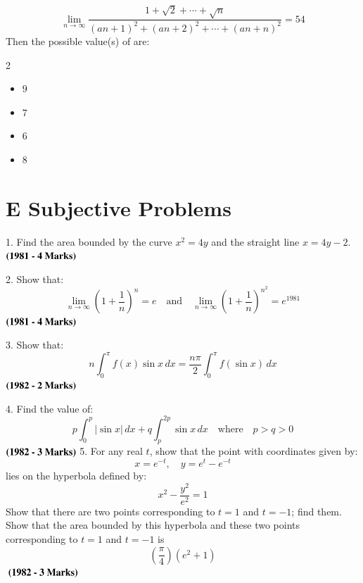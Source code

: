 \documentclass[journal,12pt,twocolumn]{IEEEtran}
\theoremstyle{remark}
\begin{document}
												     \[
												     \lim_{{n \to \infty}}
												         \frac{
													         1 + \sqrt{2} + \cdots + \sqrt{n}
														     }{
														             (an+1)^2 + (an+2)^2 + \cdots + (an+n)^2
															         } = 54
																 \]
																 Then the possible value(s) of  are:
																 \begin{multicols}{2}
																 \begin{itemize}
																     \item[(a)] $9$
																         \item[(b)] $7$
																	     \item[(c)] $6$
																	         \item[(d)] $8$
																		 \end{itemize}
																		 \end{multicols}
																		 \section*{E Subjective Problems}

																		 1. Find the area bounded by the curve \( x^2 = 4y \) and the straight line \( x = 4y - 2 \). $\hfill \textbf{(1981 - 4 Marks)}$

																		 2. Show that:
																		 \[
																		 \lim_{n \to \infty} \left(1 + \frac{1}{n}\right)^n = e \quad \text{and} \quad \lim_{n \to \infty} \left(1 + \frac{1}{n}\right)^{n^2} = e^{1981}
																		 \]
																		 $\hfill \textbf{(1981 - 4 Marks)}$

																		 3. Show that:
																		 \[
																		 n \int_0^\pi f(x) \sin x \, dx = \frac{n\pi}{2} \int_0^\pi f(\sin x) \, dx
																		 \]
																		 $\hfill \textbf{(1982 - 2 Marks)}$

																		 4. Find the value of:
																		 \[
																		 p \int_0^p |\sin x| \, dx + q \int_p^{2p} \sin x \, dx \quad \text{where} \quad p > q > 0
																		 \]
																		 $\hfill \textbf{(1982 - 3 Marks)}$
																		 5. For any real \( t \), show that the point with coordinates given by:
																		 \[
																		 x = e^{-t}, \quad y = e^{t} - e^{-t}
																		 \]
																		 lies on the hyperbola defined by:
																		 \[
																		 x^2 - \frac{y^2}{e^2} = 1
																		 \]
																		 Show that there are two points corresponding to \( t=1 \) and \( t=-1 \); find them. Show that the area bounded by this hyperbola and these two points corresponding to \( t=1 \) and \( t=-1 \) is
																		 \[
																		 \left(\frac{\pi}{4}\right)(e^2 + 1)
																		 \]
																		 $\hfill \textbf{ (1982 - 3 Marks)}$



																		 
\end{document}
